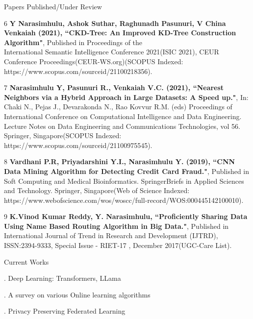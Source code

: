 \documentclass{resume} %
\begin{document}
\begin{rSection}{Papers Published/Under Review}
\begin{rSubsection}{}{}{}{}
		\item[6] \textbf{Y Narasimhulu, Ashok Suthar, Raghunadh Pasunuri, V China Venkaiah (2021), ``CKD-Tree: An Improved KD-Tree Construction Algorithm"}, Published in Proceedings of the \\ International Semantic Intelligence Conference 2021(ISIC 2021), CEUR Conference Proceedings(CEUR-WS.org)(SCOPUS Indexed: https://www.scopus.com/sourceid/21100218356).
		
		\item[7] \textbf{Narasimhulu Y, Pasunuri R., Venkaiah V.C. (2021), ``Nearest Neighbors via a Hybrid Approach in Large Datasets: A Speed up."}, In: Chaki N., Pejas J., Devarakonda N., Rao Kovvur R.M. (eds) Proceedings of International Conference on Computational Intelligence and Data Engineering. Lecture Notes on Data Engineering and Communications Technologies, vol 56. Springer, Singapore(SCOPUS Indexed: https://www.scopus.com/sourceid/21100975545).
		
		\item[8] \textbf{Vardhani P.R, Priyadarshini Y.I., Narasimhulu Y. (2019), ``CNN Data Mining Algorithm for Detecting Credit Card Fraud."}, Published in Soft Computing and Medical Bioinformatics. SpringerBriefs in Applied Sciences and Technology. Springer, Singapore(Web of Science Indexed: https://www.webofscience.com/wos/woscc/full-record/WOS:000445142100010).
		
		\item[9] \textbf{K.Vinod Kumar Reddy, Y. Narasimhulu, ``Proficiently Sharing Data Using Name Based Routing Algorithm in Big Data."}, Published in International Journal of Trend in Research and Development (IJTRD), ISSN:2394-9333, Special Issue - RIET-17 , December 2017(UGC-Care List).
	\end{rSubsection}
	
	
\end{rSection}

\begin{rSection}{Current Works}
	
	\begin{rSubsection}{}{}{}{}	
		\item[.] Deep Learning: Transformers, LLama
		\item[.] A survey on various Online learning algorithms
		\item[.] Privacy Preserving Federated Learning
	\end{rSubsection}
\end{rSection}
\end{document}
